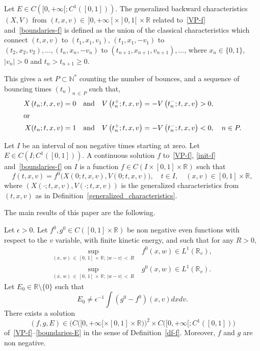 \documentclass[AHL,Unicode,longabstracts,published]{cedram}
\newcommand{\R}{\mathbb{R}}
\newcommand{\N}{\mathbb{N}}
\begin{document}
\begin{defi}\label{generalized_characteristics}
Let $E\in C([0,+\infty [; C^1([0,1]))$. The generalized backward characteristics $(X,V)$ from $(t,x,v) \in\, ]0,+\infty [
\times]0,1[\,\times \R$ related to~\eqref{VP-f} and~\eqref{boundaries-f} is defined as the union of the classical characteristics which connect $(t,x,v)$ to $(t_1,x_1,v_1)$, $(t_1,x_1,-v_1)$ to $(t_2,x_2,v_2), \ldots, (t_n,x_n,-v_n)$ to $(t_{n+1},x_{n+1},v_{n+1}), \ldots$, where $x_n \in
\{0,1\}$, $|v_n|>0$ and $t_n>t_{n+1} \geq 0$.
\end{defi}

This gives a set $P \subset \N ^*$ counting the number of bounces, and a sequence of bouncing times $(t_n)_{n\,\in\,P}$ such that,
\begin{align*}
X\left(t_n;t,x,v\right) = 0 \quad &\text{and}\quad V\left(t_n^+;t,x,v\right) = - V\left(t_n^-;t,x,v\right)> 0,
\\
\intertext{or}
X(t_n;t,x,v) = 1\quad &\text{and}\quad V\left(t_n^+;t,x,v\right) = - V\left(t_n^-;t,x,v\right) < 0,\quad n\in P.
\end{align*}

\begin{defi}\label{df-f}
Let $I$ be an interval of non negative times starting at zero. Let $E\in C(I; C^1([0,1]))$. A continuous solution $f$ to~\eqref{VP-f}, \eqref{init-f} and~\eqref{boundaries-f} on $I$ is a function $f\in C(I\times [0,1] \times \R)$ such that
\begin{equation}\label{continuite-f}
f(t,x,v)= f^0\big(X(0; t,x,v),V(0; t,x,v)\big),\quad t\in I,\quad (x,v)\in [0,1]\times \R,
\end{equation}
where $(X(\cdot ; t,x,v),V(\cdot ; t,x,v))$ is the generalized characteristics from $(t,x,v)$ as in Definition~\ref{generalized_characteristics}.
\end{defi}


The main results of this paper are the following.

\begin{theo}\label{main-result-existence}
Let $\epsilon >0$. Let $f^0, g^0 \in C([0,1] \times \R)$ be non negative even functions with respect to the $v$ variable, with finite kinetic energy, and such that for any $R>0$,
\begin{equation}\label{hyp1-f0}
\begin{split}
\sup_{(x,\,w)\,\in\,[0,\,1]\,\times\,\R ;\,|w-v|\,<\,R}\; &f^0(x,w) \in L^1\left(\R_v\right), \\\sup_{(x,\,w)\,\in\,[0,\,1]\,\times\,\R ; \,|w-v|\,<\,R}\; &g^0(x,w) \in L^1\left(\R_v\right).
\end{split}
\end{equation}
Let $E_0\in \R \setminus \{ 0\} $ such that
\begin{equation}\label{hyp-E0-E1different-de-zero}
E_0 \neq \epsilon ^{-1} \int \left(g^0-f^0\right)(x,v)dxdv.
\end{equation}
There exists a solution
\[
(f,g,E) \in \big(C\big([0,+\infty [\times [0,1] \times \R\big)\big)^2 \times C\big([0,+\infty [; C^1([0,1])\big)
\]
of~\eqref{VP-f}--\eqref{boundaries-E} in the sense of Definition~\ref{df-f}. Moreover, $f$ and $g$ are non negative.
\end{theo}
\end{document}
